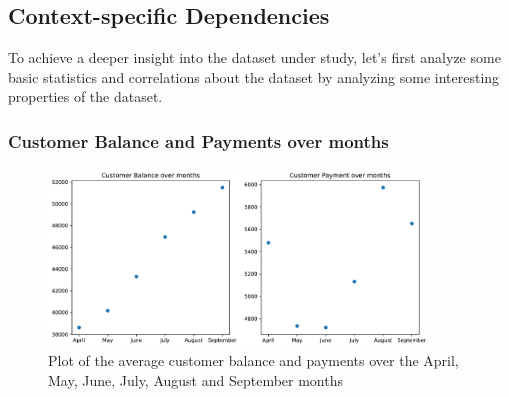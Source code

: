 \documentclass[a4paper]{article}
\begin{document}
\newpage


\subsection{Context-specific Dependencies}

To achieve a deeper insight into the dataset under study, let's first analyze some basic statistics and correlations about the dataset by analyzing some interesting properties of the dataset.

\subsubsection{Customer Balance and Payments over months}


\begin{center}
\begin{figure}

\includegraphics[width=0.9\textwidth]{../Code/Daniele/Plots/average_months.pdf}
\caption{Plot of the average customer balance and payments over the April, May, June, July, August and September months }
\label{average_months}


\end{figure}
\end{center}
\end{document}
